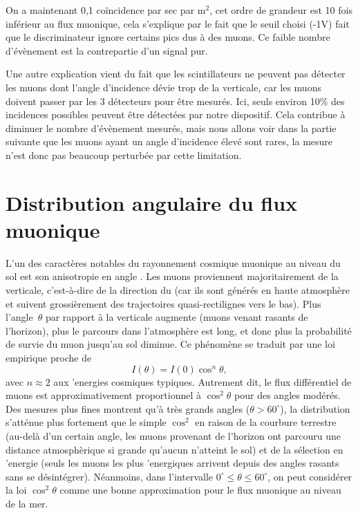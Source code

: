 \documentclass[a4paper,12pt,twoside]{article}
\begin{document}
On a maintenant 0,1 coïncidence par sec par m$^2$, cet ordre de grandeur est 10 fois inférieur au flux muonique, cela s’explique par le fait que le seuil choisi (-1V) fait que le discriminateur ignore certains pics dus à des muons. Ce faible nombre d’évènement est la contrepartie d’un signal pur.

Une autre explication vient du fait que les scintillateurs ne peuvent pas détecter les muons dont l’angle d’incidence dévie trop de la verticale, car les muons doivent passer par les 3 détecteurs pour être mesurés. Ici, seuls environ 10\% des incidences possibles peuvent être détectées par notre dispositif. Cela contribue à diminuer le nombre d’évènement mesurés, mais nous allons voir dans la partie suivante que les muons ayant un angle d’incidence élevé sont rares, la mesure n’est donc pas beaucoup perturbée par cette limitation.

\section{Distribution angulaire du flux muonique}
L'un des caract\`eres notables du rayonnement cosmique muonique au niveau du sol est son anisotropie en angle . Les muons proviennent majoritairement de la verticale, c'est-\`a-dire de la direction du  (car ils sont g\'en\'er\'es en haute atmosph\`ere et suivent grossi\`erement des trajectoires quasi-rectilignes vers le bas). Plus l'angle~$\theta$ par rapport \`a la verticale augmente (muons venant rasants de l'horizon), plus le parcours dans l'atmosph\`ere est long, et donc plus la probabilit\'e de survie du muon jusqu'au sol diminue. Ce ph\'enom\`ene se traduit par une loi empirique proche de
\[
  I(\theta) = I(0)\cos^n\theta,
\]
avec $n \approx 2$ aux 'energies cosmiques typiques. Autrement dit, le flux diff\'erentiel de muons est approximativement proportionnel \`a $\cos^2\theta$ pour des angles mod\'er\'es. Des mesures plus fines montrent qu'\`a tr\`es grands angles ($\theta > 60^\circ$), la distribution s'att\'enue plus fortement que le simple $\cos^2$ en raison de la courbure terrestre (au-del\`a d'un certain angle, les muons provenant de l'horizon ont parcouru une distance atmosph\`erique si grande qu'aucun n'atteint le sol) et de la s\'election en 'energie (seuls les muons les plus 'energiques arrivent depuis des angles rasants sans se d\'esint\'egrer). N\'eanmoins, dans l'intervalle $0^\circ \le \theta \leq 60^\circ$, on peut consid\'erer la loi $\cos^2\theta$ comme une bonne approximation pour le flux muonique au niveau de la mer.
\end{document}
